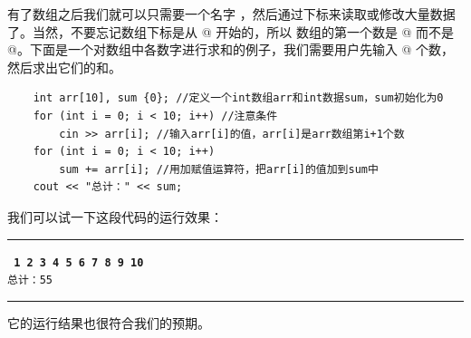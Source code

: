 有了数组之后我们就可以只需要一个名字 \lstinline@array@，然后通过下标来读取或修改大量数据了。当然，不要忘记数组下标是从 @ 开始的，所以 \lstinline@array@ 数组的第一个数是 \lstinline@array[0]@ 而不是 \lstinline@array[1]@。下面是一个对数组中各数字进行求和的例子，我们需要用户先输入 @ 个数，然后求出它们的和。\pagebreak
\begin{lstlisting}
    int arr[10], sum {0}; //定义一个int数组arr和int数据sum，sum初始化为0
    for (int i = 0; i < 10; i++) //注意条件
        cin >> arr[i]; //输入arr[i]的值，arr[i]是arr数组第i+1个数
    for (int i = 0; i < 10; i++)
        sum += arr[i]; //用加赋值运算符，把arr[i]的值加到sum中
    cout << "总计：" << sum;
\end{lstlisting}
我们可以试一下这段代码的运行效果：\\\noindent\rule{\linewidth}{0.2pt}\texttt{
\textbf{1 2 3 4 5 6 7 8 9 10}\\
总计：55
}\\\noindent\rule{\linewidth}{0.2pt}
它的运行结果也很符合我们的预期。\par
